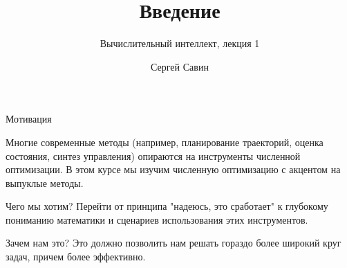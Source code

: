 \documentclass{beamer}
\title{Введение}
\subtitle{Вычислительный интеллект, лекция 1}
\author{Сергей Савин}
\date{\mydate}
\begin{document}
\maketitle


%
%

\begin{frame}{Мотивация}
	\begin{flushleft}
		
		Многие современные методы (например, планирование траекторий, оценка состояния, синтез управления) опираются на инструменты численной оптимизации. В этом курсе мы изучим численную оптимизацию с акцентом на выпуклые методы.
		
		\begin{block}{Чего мы хотим?}
			Перейти от принципа "надеюсь, это сработает" к глубокому пониманию математики и сценариев использования этих инструментов.
		\end{block}
		
		\begin{block}{Зачем нам это?}
			Это должно позволить нам решать гораздо более широкий круг задач, причем более эффективно.
		\end{block}
		
	\end{flushleft}
\end{frame}
\end{document}
